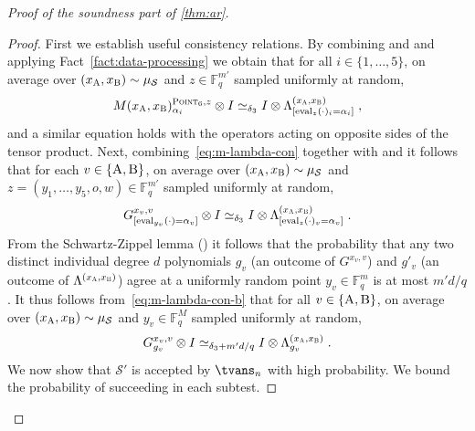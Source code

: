 \documentclass[11pt]{article}
\theoremstyle{definition}
\newcommand{\F}{\ensuremath{\mathbb{F}}}
\newcommand{\ot}{\otimes}
\newcommand{\sampler}{\mathcal{S}}
\newcommand{\strategy}{\mathscr{S}}
\newcommand{\labelstyle}[1]{\ensuremath{\textsc{#1}}\xspace}
\newcommand{\alice}{\labelstyle{A}}
\newcommand{\bob}{\labelstyle{B}}
\newcommand{\typestyle}[1]{\ensuremath{\textsc{#1}}\xspace}
\newcommand{\Point}{\typestyle{Point}}
\newcommand{\eval}{\mathrm{eval}}
\begin{document}
\begin{proof}[Proof of the soundness part of \cref{thm:ar}]
\begin{proof}
  First we establish useful consistency relations.
  By combining  and  and applying
  Fact~\ref{fact:data-processing} we obtain that for all $i\in \{1,\ldots,5\}$,
  on average over $({x}_\alice, {x}_\bob) \sim \mu_{\sampler}$ and $z\in
  \F_q^{m'}$ sampled uniformly at random,
  \begin{equation}
    \label{eq:m-lambda-con}
    M({x}_\alice, {x}_\bob)^{\Point_6, z}_{\alpha_i} \ot I
    \simeq_{\delta_3} I \ot  \Lambda^{({x}_\alice, {x}_\bob)}_{[\eval_z(\cdot)_i =
      \alpha_i]}\;,
  \end{equation}
	and a similar equation holds with the operators acting on opposite sides of
  the tensor product.
  Next, combining~\eqref{eq:m-lambda-con} together with
   and  it follows that for
  each $v \in \{\alice,\bob\}$, on average over $({x}_\alice, {x}_\bob) \sim
  \mu_{\sampler}$ and $z=(y_1,\ldots,y_5,o,w) \in \F_q^{m'}$ sampled uniformly
  at random,
  \begin{equation}\label{eq:m-lambda-con-b}
    G^{{x}_v, v}_{[\eval_{y_v}(\cdot) = \alpha_v]} \ot I \simeq_{\delta_3} I \ot
    \Lambda^{({x}_\alice, {x}_\bob)}_{[\eval_z(\cdot)_v = \alpha_v]}\;.
  \end{equation}
  From the Schwartz-Zippel lemma () it follows that
  the probability that any two distinct individual degree $d$ polynomials $g_v$
  (an outcome of $G^{{x}_v, v}$) and $g'_v$ (an outcome of
  $\Lambda^{({x}_\alice, {x}_\bob)}$) agree at a uniformly random point $y_v\in
  \F_q^m$ is at most $m'd/q$.
  It thus follows from~\eqref{eq:m-lambda-con-b} that for all
  $v\in\{\alice,\bob\}$, on average over $({x}_\alice, {x}_\bob) \sim
  \mu_{\sampler}$ and $y_v \in\F_q^M$ sampled uniformly at random,
  \begin{equation}
    \label{eq:ld-strat-con-def}
    G^{{x}_v, v}_{g_v} \ot I \simeq_{\delta_3+m'd/q} I \ot \Lambda^{({x}_\alice,
      x_\bob)}_{g_v}\;.
  \end{equation}
  We now show that $\strategy'$ is accepted by $\tvans_n$ with high
  probability.
  We bound the probability of succeeding in each subtest.


\end{proof}
\end{proof}
\end{document}
